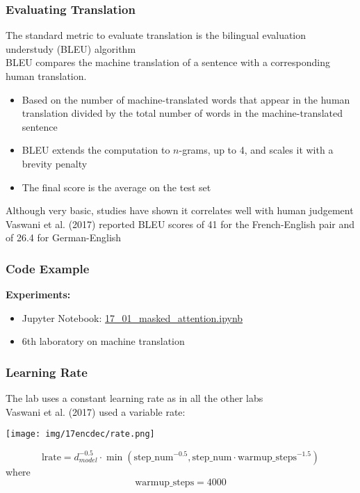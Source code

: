 \begin{frame}[fragile]
\frametitle{Evaluating Translation}\color{structure}
The standard metric to evaluate translation is the bilingual evaluation understudy (BLEU) algorithm\\
BLEU compares the machine translation of a sentence with a corresponding human translation.
\begin{itemize}\color{structure}
\item Based on the number of machine-translated words that appear in the human translation divided by the total number of words in the machine-translated sentence
\item BLEU extends the computation to $n$-grams, up to 4, and scales it with a brevity penalty
\item The final score is the average on the test set
\end{itemize}
Although very basic, studies have shown it correlates well with human judgement\\
Vaswani et al. (2017) reported BLEU scores of 41 for the French-English pair and of 26.4 for German-English
\end{frame}


\begin{frame}[fragile]
\frametitle{Code Example}\color{structure}

\textbf{Experiments:} 
\begin{itemize}\color{structure}
\item Jupyter Notebook: \url{17_01_masked_attention.ipynb}
\item 6th laboratory on machine translation
\end{itemize}

\end{frame}

\begin{frame}[fragile]
\frametitle{Learning Rate}\color{structure}
The lab uses a constant learning rate as in all the other labs\\

Vaswani et al. (2017) used a variable rate:
\begin{center}
 \texttt{[image: img/17encdec/rate.png]}
\end{center}

\[
\text{lrate} = d^{-0.5}_{model} \cdot \min(\text{step\_num}^{-0.5}, \text{step\_num} \cdot \text{warmup\_steps}^{-1.5}) 
\]
where
\[
\text{warmup\_steps} = 4000
\]
\end{frame}

